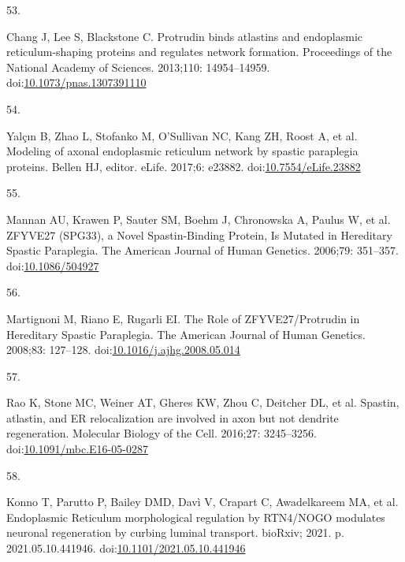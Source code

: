 \documentclass[
  12pt,
  a4paper,
]{book}
\newlength{\cslhangindent}
\newlength{\csllabelwidth}
\newlength{\cslentryspacingunit} %
\newenvironment{CSLReferences}[2] %
 {%
  \setlength{\parindent}{0pt}
  \ifodd #1
  \let\oldpar\par
  \def\par{\hangindent=\cslhangindent\oldpar}
  \fi
  \setlength{\parskip}{#2\cslentryspacingunit}
 }%
 {}
\newcommand{\CSLLeftMargin}[1]{\parbox[t]{\csllabelwidth}{#1}}
\newcommand{\CSLRightInline}[1]{\parbox[t]{\linewidth - \csllabelwidth}{#1}\break}
\begin{document}
\begin{CSLReferences}{0}{0}
\leavevmode{}%
\CSLLeftMargin{53. }%
\CSLRightInline{Chang J, Lee S, Blackstone C. Protrudin binds atlastins and endoplasmic reticulum-shaping proteins and regulates network formation. Proceedings of the National Academy of Sciences. 2013;110: 14954--14959. doi:\href{https://doi.org/10.1073/pnas.1307391110}{10.1073/pnas.1307391110}}

\leavevmode{}%
\CSLLeftMargin{54. }%
\CSLRightInline{Yalçın B, Zhao L, Stofanko M, O'Sullivan NC, Kang ZH, Roost A, et al. Modeling of axonal endoplasmic reticulum network by spastic paraplegia proteins. Bellen HJ, editor. eLife. 2017;6: e23882. doi:\href{https://doi.org/10.7554/eLife.23882}{10.7554/eLife.23882}}

\leavevmode{}%
\CSLLeftMargin{55. }%
\CSLRightInline{Mannan AU, Krawen P, Sauter SM, Boehm J, Chronowska A, Paulus W, et al. {ZFYVE27} ({SPG33}), a {Novel Spastin-Binding Protein}, {Is Mutated} in {Hereditary Spastic Paraplegia}. The American Journal of Human Genetics. 2006;79: 351--357. doi:\href{https://doi.org/10.1086/504927}{10.1086/504927}}

\leavevmode{}%
\CSLLeftMargin{56. }%
\CSLRightInline{Martignoni M, Riano E, Rugarli EI. The {Role} of {ZFYVE27}/{Protrudin} in {Hereditary Spastic Paraplegia}. The American Journal of Human Genetics. 2008;83: 127--128. doi:\href{https://doi.org/10.1016/j.ajhg.2008.05.014}{10.1016/j.ajhg.2008.05.014}}

\leavevmode{}%
\CSLLeftMargin{57. }%
\CSLRightInline{Rao K, Stone MC, Weiner AT, Gheres KW, Zhou C, Deitcher DL, et al. Spastin, atlastin, and {ER} relocalization are involved in axon but not dendrite regeneration. Molecular Biology of the Cell. 2016;27: 3245--3256. doi:\href{https://doi.org/10.1091/mbc.E16-05-0287}{10.1091/mbc.E16-05-0287}}

\leavevmode{}%
\CSLLeftMargin{58. }%
\CSLRightInline{Konno T, Parutto P, Bailey DMD, Davì V, Crapart C, Awadelkareem MA, et al. Endoplasmic {Reticulum} morphological regulation by {RTN4}/{NOGO} modulates neuronal regeneration by curbing luminal transport. {bioRxiv}; 2021. p. 2021.05.10.441946. doi:\href{https://doi.org/10.1101/2021.05.10.441946}{10.1101/2021.05.10.441946}}


\end{CSLReferences}
\end{document}
